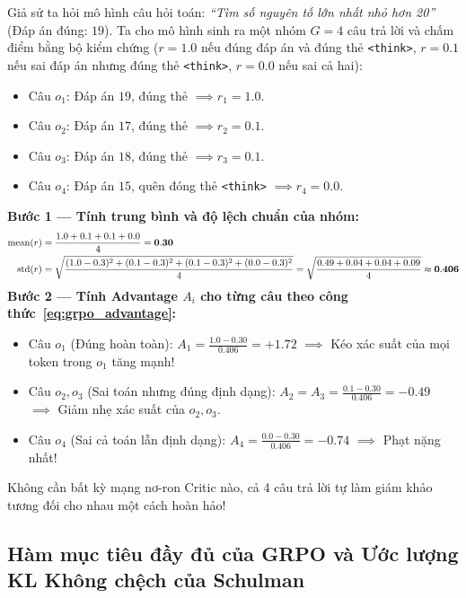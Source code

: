 \begin{mathdecode}[Tính bằng tay một bước cập nhật GRPO với $G = 4$]
Giả sử ta hỏi mô hình câu hỏi toán: \textit{``Tìm số nguyên tố lớn nhất nhỏ hơn 20''} (Đáp án đúng: $19$). Ta cho mô hình sinh ra một nhóm $G = 4$ câu trả lời và chấm điểm bằng bộ kiểm chứng ($r = 1.0$ nếu đúng đáp án và đúng thẻ \texttt{<think>}, $r = 0.1$ nếu sai đáp án nhưng đúng thẻ \texttt{<think>}, $r = 0.0$ nếu sai cả hai):
\begin{itemize}
  \item Câu $o_1$: Đáp án $19$, đúng thẻ $\implies r_1 = 1.0$.
  \item Câu $o_2$: Đáp án $17$, đúng thẻ $\implies r_2 = 0.1$.
  \item Câu $o_3$: Đáp án $18$, đúng thẻ $\implies r_3 = 0.1$.
  \item Câu $o_4$: Đáp án $15$, quên đóng thẻ \texttt{<think>} $\implies r_4 = 0.0$.
\end{itemize}
\textbf{Bước 1 --- Tính trung bình và độ lệch chuẩn của nhóm:}
\begin{align*}
  \operatorname{\mathrm{mean}}(r) &= \frac{1.0 + 0.1 + 0.1 + 0.0}{4} = \mathbf{0.30} \\
  \operatorname{\mathrm{std}}(r) &= \sqrt{\frac{(1.0 - 0.3)^2 + (0.1 - 0.3)^2 + (0.1 - 0.3)^2 + (0.0 - 0.3)^2}{4}} = \sqrt{\frac{0.49 + 0.04 + 0.04 + 0.09}{4}} \approx \mathbf{0.406}
\end{align*}
\textbf{Bước 2 --- Tính Advantage $A_i$ cho từng câu theo công thức~\eqref{eq:grpo_advantage}:}
\begin{itemize}
  \item Câu $o_1$ (Đúng hoàn toàn): $A_1 = \frac{1.0 - 0.30}{0.406} = \mathbf{+1.72}$ $\implies$ Kéo xác suất của mọi token trong $o_1$ tăng mạnh!
  \item Câu $o_2, o_3$ (Sai toán nhưng đúng định dạng): $A_2 = A_3 = \frac{0.1 - 0.30}{0.406} = \mathbf{-0.49}$ $\implies$ Giảm nhẹ xác suất của $o_2, o_3$.
  \item Câu $o_4$ (Sai cả toán lẫn định dạng): $A_4 = \frac{0.0 - 0.30}{0.406} = \mathbf{-0.74}$ $\implies$ Phạt nặng nhất!
\end{itemize}
Không cần bất kỳ mạng nơ-ron Critic nào, cả 4 câu trả lời tự làm giám khảo tương đối cho nhau một cách hoàn hảo!
\end{mathdecode}

\subsection{Hàm mục tiêu đầy đủ của GRPO và Ước lượng KL Không chệch của Schulman}

